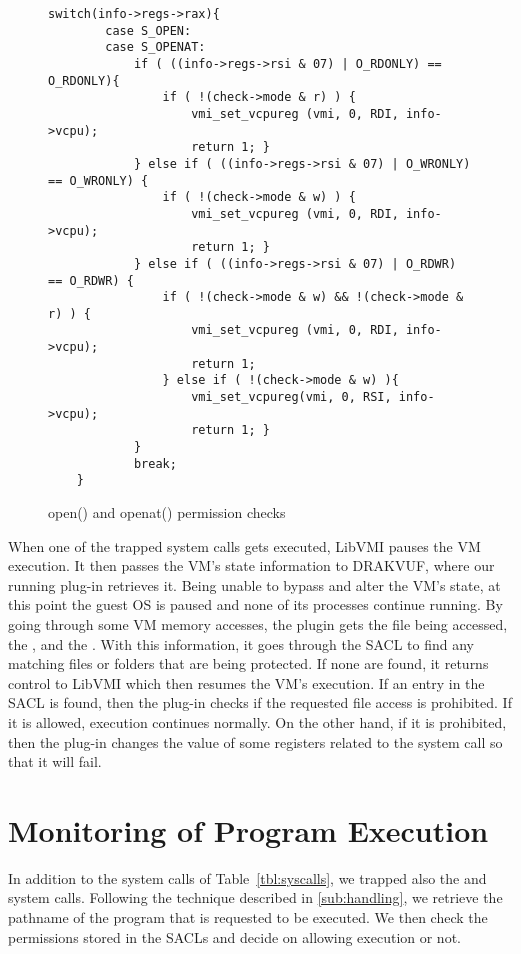 \begin{figure}[ht!]
\selectfont
\begin{lstlisting}[style=CStyle]
	switch(info->regs->rax){
		case S_OPEN:
		case S_OPENAT:
			if ( ((info->regs->rsi & 07) | O_RDONLY) == O_RDONLY){
				if ( !(check->mode & r) ) {
					vmi_set_vcpureg (vmi, 0, RDI, info->vcpu);
					return 1; }
			} else if ( ((info->regs->rsi & 07) | O_WRONLY) == O_WRONLY) {
				if ( !(check->mode & w) ) {
					vmi_set_vcpureg (vmi, 0, RDI, info->vcpu);
					return 1; }
			} else if ( ((info->regs->rsi & 07) | O_RDWR) == O_RDWR) {
				if ( !(check->mode & w) && !(check->mode & r) ) {
					vmi_set_vcpureg (vmi, 0, RDI, info->vcpu);
					return 1;
				} else if ( !(check->mode & w) ){
					vmi_set_vcpureg(vmi, 0, RSI, info->vcpu);
					return 1; }
			}
			break;
	}
\end{lstlisting}
	\caption{open() and openat() permission checks}
	\label{fig:open}
\end{figure}

\par When one of the trapped system calls gets executed, LibVMI pauses the \ac{VM} execution. It then passes the \ac{VM}'s state information to DRAKVUF, where our running plug-in retrieves it. Being unable to bypass and alter the \ac{VM}'s state, at this point the guest \ac{OS} is paused and none of its processes continue running. By going through some \ac{VM} memory accesses, the plugin gets the file being accessed, the , and the . With this information, it goes through the \ac{SACL} to find any matching files or folders that are being protected. If none are found, it returns control to LibVMI which then resumes the \ac{VM}'s execution. If an entry in the \ac{SACL} is found, then the plug-in checks if the requested file access is prohibited. If it is allowed, execution continues normally. On the other hand, if it is prohibited,  then the plug-in changes the value of some registers related to the system call so that it will fail.


\section{Monitoring of Program Execution}

\par In addition to the system calls of Table~\ref{tbl:syscalls}, we trapped also the  and  system calls. Following the technique described in \ref{sub:handling}, we retrieve the pathname of the program that is requested to be executed. We then check the permissions stored in the \acp{SACL} and decide on allowing execution or not.

